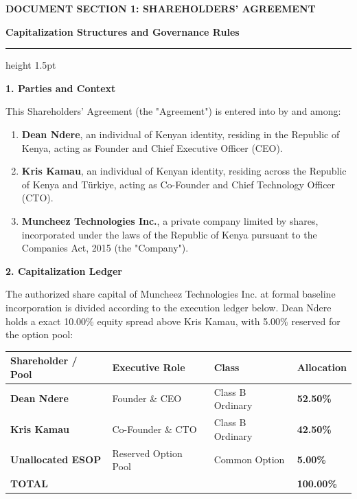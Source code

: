 \documentclass[11pt,a4paper]{article}
\begin{document}
\newpage
\pagestyle{plain}

{\fontsize{18}{22}\sffamily\bfseries\color{CorporateNavy} DOCUMENT SECTION 1: SHAREHOLDERS' AGREEMENT}

\vspace{0.1cm}
\textsf{\small\bfseries\color{LinkBlue} Capitalization Structures and Governance Rules}
\vspace{0.2cm}
\color{RuleNavy}\hrule height 1.5pt
\vspace{0.4cm}

\textbf{\color{CorporateNavy} 1. Parties and Context}

This Shareholders' Agreement (the "Agreement") is entered into by and among:
\begin{enumerate}
    \item \textbf{Dean Ndere}, an individual of Kenyan identity, residing in the Republic of Kenya, acting as Founder and Chief Executive Officer (CEO).
    \item \textbf{Kris Kamau}, an individual of Kenyan identity, residing across the Republic of Kenya and Türkiye, acting as Co-Founder and Chief Technology Officer (CTO).
    \item \textbf{Muncheez Technologies Inc.}, a private company limited by shares, incorporated under the laws of the Republic of Kenya pursuant to the Companies Act, 2015 (the "Company").
\end{enumerate}

\vspace{0.2cm}
\textbf{\color{CorporateNavy} 2. Capitalization Ledger}

The authorized share capital of Muncheez Technologies Inc. at formal baseline incorporation is divided according to the execution ledger below. Dean Ndere holds a exact 10.00\% equity spread above Kris Kamau, with 5.00\% reserved for the option pool:

\vspace{0.3cm}
\begin{table}[h!]
\centering
\small
\begin{tabularx}{\textwidth}{@{} X p{4.5cm} >{\raggedleft\arraybackslash}X >{\raggedleft\arraybackslash}X @{}}
    \toprule
    \textbf{\color{CorporateNavy} Shareholder / Pool} & \textbf{\color{CorporateNavy} Executive Role} & \textbf{\color{CorporateNavy} Class} & \textbf{\color{CorporateNavy} Allocation} \\
    \midrule
    \textbf{Dean Ndere} & Founder \& CEO & Class B Ordinary & \textbf{52.50\%} \\
    \textbf{Kris Kamau} & Co-Founder \& CTO & Class B Ordinary & \textbf{42.50\%} \\
    \textbf{Unallocated ESOP} & Reserved Option Pool & Common Option & \textbf{5.00\%} \\
    \midrule
    \textbf{\color{CorporateNavy} TOTAL} & & & \textbf{\color{CorporateNavy} 100.00\%} \\
    \bottomrule
\end{tabularx}
\end{table}
\end{document}
